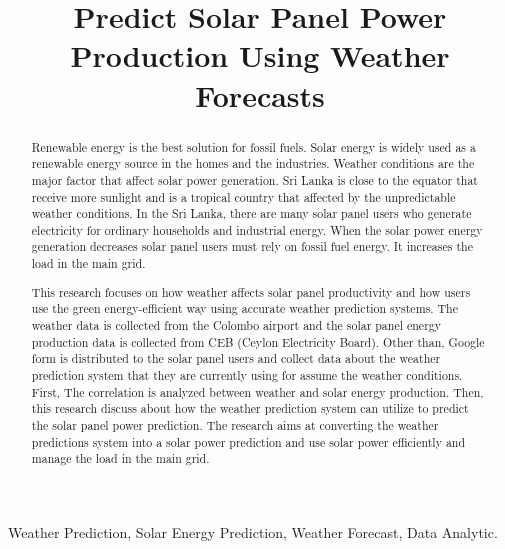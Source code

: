 \documentclass[conference]{IEEEtran}
\begin{document}
\title{Predict Solar Panel Power Production Using Weather Forecasts}

\author{
}

\maketitle

\begin{abstract}
Renewable energy is the best solution for fossil fuels. Solar energy is widely used as a renewable energy source in the homes and the industries. Weather conditions are the major factor that affect solar power generation. Sri Lanka is close to the equator that receive more sunlight and is a tropical country that affected by the unpredictable weather conditions. In the Sri Lanka, there are many solar panel users who generate electricity for ordinary households and industrial energy. When the solar power energy generation decreases solar panel users must rely on fossil fuel energy. It increases the load in the main grid. 

This research focuses on how weather affects solar panel productivity and how users use the green energy-efficient way using accurate weather prediction systems. The weather data is collected from the Colombo airport and the solar panel energy production data is collected from CEB (Ceylon Electricity Board). Other than, Google form is distributed to the solar panel users and collect data about the weather prediction system that they are currently using for assume the weather conditions. First, The correlation is analyzed between weather and solar energy production. Then, this research discuss about how the weather prediction system can utilize to predict the solar panel power prediction. The research aims at converting the weather predictions system into a solar power prediction and use solar power efficiently and manage the load in the main grid.\\
\end{abstract}

\begin{IEEEkeywords}
Weather Prediction, Solar Energy Prediction, Weather Forecast, Data Analytic.
\end{IEEEkeywords}
\end{document}
